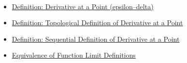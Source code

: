 \begin{remark*}[Dependencies]~\\
\begin{itemize}
  \item \hyperref[def:derivative-at-a-point]{Definition: Derivative at a Point (epsilon--delta)}
  \item \hyperref[def:topological-definition-of-derivative-at-a-point]{Definition: Topological Definition of Derivative at a Point}
  \item \hyperref[def:sequential-definition-of-derivative-at-a-point]{Definition: Sequential Definition of Derivative at a Point}
  \item \hyperref[thm:equivalence-of-function-limit-definitions]{Equivalence of Function Limit Definitions}
\end{itemize}
\end{remark*}

\clearpage
